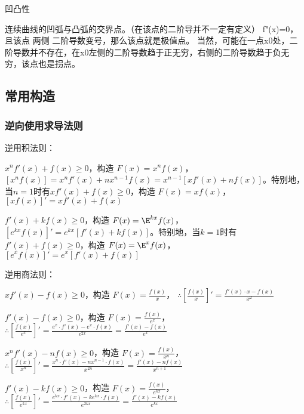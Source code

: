 凹凸性

连续曲线的凹弧与凸弧的交界点。（在该点的二阶导并不一定有定义）
f"(x)=0，且该点 两侧 二阶导数变号，那么该点就是极值点。
当然，可能在一点x0处，二阶导数并不存在，在x0左侧的二阶导数趋于正无穷，右侧的二阶导数趋于负无穷，该点也是拐点。

\subsection{常用构造}


\subsubsection{逆向使用求导法则}

逆用积法则：

$x^n f'(x) + f(x) \geq 0$，构造 $F(x) = x^n f(x)$，$[x^n f(x)] = x^n f'(x) + nx^{n-1} f(x) = x^{n-1} [x f'(x) + nf(x)]$。特别地，当$n=1$时有$x f'(x) + f(x) \geq 0$，构造 $F(x) = x f(x)$，$[x f(x)]' = x f'(x) + f(x)$

$f'(x) + k f(x) \geq 0$，构造 $F(x) = \E^{kx} f(x)$，$[e^{kx} f(x)]' = e^{kx} [f'(x) + kf(x)]$。特别地，当$k=1$时有$f'(x) + f(x) \geq 0$，构造 $F(x) = \E^x f(x)$，$[e^x f(x)]' = e^x [f'(x) + f(x)]$

逆用商法则：

$xf'(x) - f(x) \geq 0$，构造 $F(x) = \frac{f(x)}{x}$，  
    $\therefore \left[\frac{f(x)}{x}\right]' = \frac{f'(x) \cdot x - f(x)}{x^2}$

$f'(x) - f(x) \geq 0$，构造 $F(x) = \frac{f(x)}{e^x}$，  
    $\therefore \left[\frac{f(x)}{e^x}\right]' = \frac{e^x \cdot f'(x) - e^x \cdot f(x)}{e^{2x}} = \frac{f'(x) - f(x)}{e^x}$

$x^n f'(x) - n f(x) \geq 0$，构造 $F(x) = \frac{f(x)}{x^n}$，  
    $\therefore \left[\frac{f(x)}{x^n}\right]' = \frac{x^n \cdot f'(x) - n x^{n-1} \cdot f(x)}{x^{2n}} = \frac{f'(x) - n f(x)}{x^{n+1}}$

$f'(x) - k f(x) \geq 0$，构造 $F(x) = \frac{f(x)}{e^{kx}}$，  
    $\therefore \left[\frac{f(x)}{e^{kx}}\right]' = \frac{e^{kx} \cdot f'(x) - k e^{kx} \cdot f(x)}{e^{2kx}} = \frac{f'(x) - k f(x)}{e^{kx}}$
